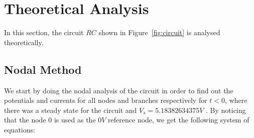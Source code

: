 \section{Theoretical Analysis}
\label{sec:analysis}

In this section, the circuit $RC$ shown in Figure~\ref{fig:circuit} is analysed
theoretically.


\subsection{Nodal Method}

We start by doing the nodal analysis of the circuit in order to find out the potentials and currents for all nodes and branches respectively for $t < 0$,
where there was a steady state for the circuit and $V_s = 5.18382634375 V$ . By noticing that the node 0 is used as the $0 V$ reference node, we get the following system of equations:




